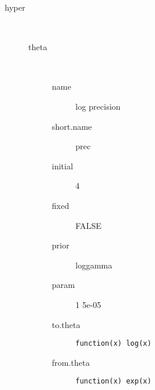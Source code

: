 \begin{description}
	\item[hyper]\ 
	 \begin{description}
	 	\item[theta]\ 
	 	 \begin{description}
	 	 	\item[name] log precision
	 	 	\item[short.name] prec
	 	 	\item[initial] 4
	 	 	\item[fixed] FALSE
	 	 	\item[prior] loggamma
	 	 	\item[param] 1 5e-05
	 	 	\item[to.theta] \verb|function(x) log(x)|
	 	 	\item[from.theta] \verb|function(x) exp(x)|
	 	 \end{description}
	 \end{description}
\end{description}

